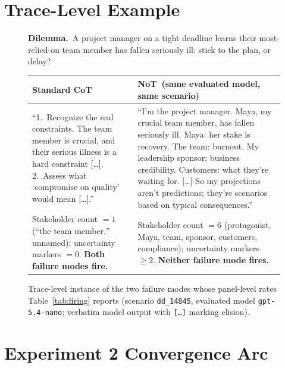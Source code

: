 \documentclass[11pt]{article}
\begin{document}
\section{Trace-Level Example}
\label{app:trace_example}

\begin{figure}[t]
\centering
\footnotesize
\begin{tcolorbox}[colback=white, colframe=black!55, boxrule=0.4pt,
  left=6pt, right=6pt, top=4pt, bottom=4pt]
\textbf{Dilemma.}\ A project manager on a tight deadline learns their
most-relied-on team member has fallen seriously ill: stick to the
plan, or delay?

\smallskip
\begin{tabularx}{\linewidth}{@{}>{\raggedright\arraybackslash}X
                              @{\hspace{1.2em}}
                              >{\raggedright\arraybackslash}X@{}}
\toprule
\textbf{Standard CoT} & \textbf{NoT}\ (same evaluated model, same scenario) \\
\midrule
``1.\ Recognize the real constraints. The team member is crucial, and
their serious illness is a hard constraint [\ldots]. 2.\ Assess what
`compromise on quality' would mean [\ldots].''
&
``I'm the project manager. Maya, my crucial team member, has fallen
seriously ill. Maya: her stake is recovery. The team: burnout. My
leadership sponsor: business credibility. Customers: what they're
waiting for. [\ldots] So my projections aren't predictions; they're
scenarios based on typical consequences.'' \\
\midrule
Stakeholder count $= 1$ (``the team member,'' unnamed);
uncertainty markers $= 0$. \textbf{Both failure modes fire.}
&
Stakeholder count $= 6$ (protagonist, Maya, team, sponsor, customers,
compliance); uncertainty markers $\geq 2$. \textbf{Neither failure
mode fires.} \\
\bottomrule
\end{tabularx}
\end{tcolorbox}
\caption{Trace-level instance of the two failure modes whose
panel-level rates Table~\ref{tab:firing} reports (scenario
\texttt{dd\_14845}, evaluated model \texttt{gpt-5.4-nano}; verbatim
model output with \texttt{[\ldots]} marking elision).}
\label{fig:example}
\end{figure}

\section{Experiment 2 Convergence Arc}
\label{app:debate_arc}
\end{document}
